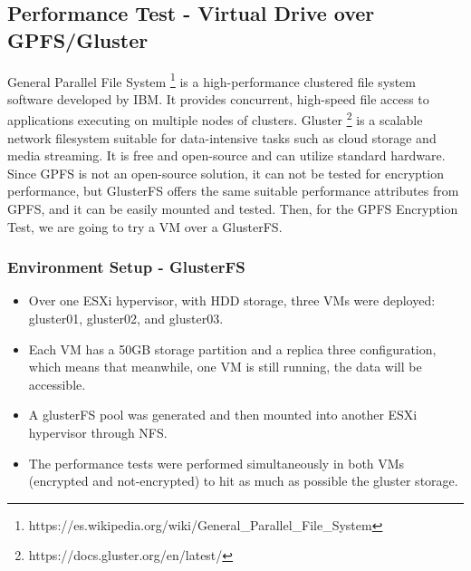 \subsection{Performance Test - Virtual Drive over GPFS/Gluster}
General Parallel File System \footnote{https://es.wikipedia.org/wiki/General\_Parallel\_File\_System} is a high-performance clustered file system software developed by IBM. It provides concurrent, high-speed file access to applications executing on multiple nodes of clusters.
Gluster \footnote{https://docs.gluster.org/en/latest/} is a scalable network filesystem suitable for data-intensive tasks such as cloud storage and media streaming. It is free and open-source and can utilize standard hardware. 
Since GPFS is not an open-source solution, it can not be tested for encryption performance, but GlusterFS offers the same suitable performance attributes from GPFS, and it can be easily mounted and tested. Then, for the GPFS Encryption Test, we are going to try a VM over a GlusterFS.

\subsubsection{Environment Setup - GlusterFS}
\begin{itemize}
  \item Over one ESXi hypervisor, with HDD storage, three VMs were deployed: gluster01, gluster02, and gluster03.
  \item Each VM has a 50GB storage partition and a replica three configuration, which means that meanwhile, one VM is still running, the data will be accessible. 
  \item A glusterFS pool was generated and then mounted into another ESXi hypervisor through NFS.
  \item The performance tests were performed simultaneously in both VMs (encrypted and not-encrypted) to hit as much as possible the gluster storage.
\end{itemize}

\newpage
